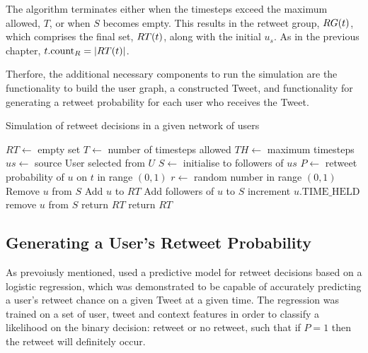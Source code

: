 The algorithm terminates either when the timesteps exceed the maximum allowed, $T$, or when $S$ becomes empty. This results in the retweet group, $RG(t)$, which comprises the final set, $RT(t)$, along with the initial $u_s$. As in the previous chapter, $t.\textrm{count}_R = |RT(t)|$.

Therfore, the additional necessary components to run the simulation are the functionality to build the user graph, a constructed Tweet, and functionality for generating a retweet probability for each user who receives the Tweet.

\begin{algorithm}
\caption{Simulation of retweet decisions in a given network of users}
\begin{algorithmic}[1]
    \State $RT\gets$ empty set 
    \State $T\gets$ number of timesteps allowed
    \State $TH\gets$ maximum timesteps 
    \State $us\gets$ source User selected from $U$
    \State $S\gets$ initialise to followers of $us$
    \Statex %
            \State $P\gets$ retweet probability of $u$ on $t$ in range $(0,1)$
            \State $r\gets$ random number in range $(0,1)$
                \State Remove $u$ from $S$
                \State Add $u$ to $RT$
                \State Add followers of $u$ to $S$
            \Else
                \State increment $u.\textrm{TIME\_HELD}$
                    \State remove $u$ from $S$ 
                \EndIf
            \EndIf
        \EndFor
            \State return $RT$ 
        \EndIf
    \EndFor
    \State return $RT$
\EndProcedure
\end{algorithmic}
\label{algo1}
\end{algorithm}


\subsection{Generating a User's Retweet Probability} 
As prevoiusly mentioned, \cite{zhu11} used a predictive model for retweet decisions based on a logistic regression, which was demonstrated to be capable of accurately predicting a user's retweet chance on a given Tweet at a given time. The regression was trained on a set of user, tweet and context features in order to classify a likelihood on the binary decision: retweet or no retweet, such that if $P = 1$ then the retweet will definitely occur.


